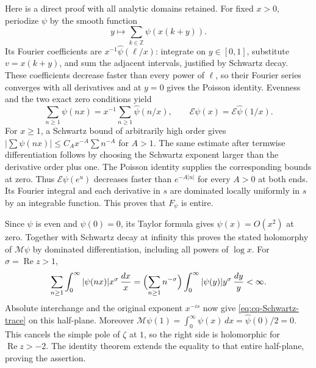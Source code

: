 Here is a direct proof with all analytic domains retained.
For fixed $x>0$, periodize $\psi$ by the smooth function
\[
 y\longmapsto\sum_{k\in\mathbb Z}\psi(x(k+y)).
\]
Its Fourier coefficients are $x^{-1}\widehat\psi(\ell/x)$:
integrate on $y\in[0,1]$, substitute $v=x(k+y)$, and sum the
adjacent intervals, justified by Schwartz decay. These coefficients
decrease faster than every power of $\ell$, so their Fourier series
converges with all derivatives and at $y=0$ gives the Poisson
identity. Evenness and the two exact zero conditions yield
\[
 \sum_{n\geq1}\psi(nx)=x^{-1}\sum_{n\geq1}\widehat\psi(n/x),
 \qquad \mathcal E\psi(x)=\mathcal E\widehat\psi(1/x).
\]
For $x\geq1$, a Schwartz bound of arbitrarily high order gives
$|\sum\psi(nx)|\leq C_Ax^{-A}\sum n^{-A}$ for $A>1$.
The same estimate after termwise differentiation follows by choosing
the Schwartz exponent larger than the derivative order plus one.
The Poisson identity supplies the corresponding bounds at zero.
Thus $\mathcal E\psi(e^u)$ decreases faster than $e^{-A|u|}$
for every $A>0$ at both ends. Its Fourier integral and each
derivative in $s$ are dominated locally uniformly in $s$ by an
integrable function. This proves that $F_\psi$ is entire.

Since $\psi$ is even and $\psi(0)=0$, its Taylor formula gives
$\psi(x)=O(x^2)$ at zero. Together with Schwartz decay at infinity
this proves the stated holomorphy of $\mathcal M\psi$ by
dominated differentiation, including all powers of $\log x$.
For $\sigma=\operatorname{Re}z>1$,
\[
 \sum_{n\geq1}\int_0^\infty|\psi(nx)|x^\sigma\,\frac{dx}{x}
 =\Bigl(\sum_{n\geq1}n^{-\sigma}\Bigr)
          \int_0^\infty|\psi(y)|y^\sigma\,\frac{dy}{y}<\infty.
\]
Absolute interchange and the original exponent $x^{-is}$ now give
\eqref{eq:cq-Schwartz-trace} on this half-plane. Moreover
$\mathcal M\psi(1)=\int_0^\infty\psi(x)\,dx
=\widehat\psi(0)/2=0$. This cancels the simple pole of $\zeta$
at $1$, so the right side is holomorphic for
$\operatorname{Re}z>-2$. The identity theorem extends the equality
to that entire half-plane, proving the assertion.

